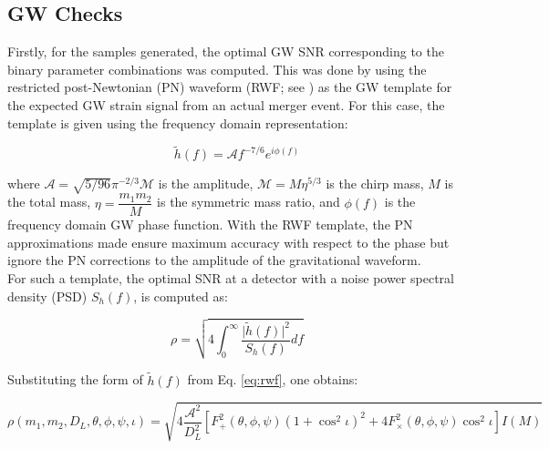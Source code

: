     \subsection{GW Checks}\label{sub:gw_checks}

        Firstly, for the samples generated, the optimal GW SNR corresponding to the
        binary parameter combinations was computed. This was done by using the
        restricted post-Newtonian (PN) waveform (RWF; see \cite{cutler_1994}) as the GW
        template for the expected GW strain signal from an actual merger event. For this
        case, the template is given using the frequency domain representation:

        \begin{equation}
            \tilde{h}(f) = \mathcal{A}f^{-7/6}e^{i\phi(f)}
            \label{eq:rwf}
        \end{equation}

        where $\mathcal{A} = \sqrt{5/96}\pi^{-2/3} \mathcal{M}$ is the amplitude,
        $\mathcal{M} = M \eta^{5/3}$ is the chirp mass, $M$ is the total mass, $\eta =
        \dfrac{m_1 m_2}{M}$ is the symmetric mass ratio, and $\phi(f)$ is the frequency
        domain GW phase function. With the RWF template, the PN approximations made
        ensure maximum accuracy with respect to the phase but ignore the PN corrections
        to the amplitude of the gravitational waveform.\\
        For such a template, the optimal SNR at a  detector with a noise power spectral
        density (PSD) $S_h(f)$, is computed as:

        \begin{equation}
            \rho = \sqrt{
                            4\int_0^\infty
                            \dfrac{\lvert \tilde{h}(f) \rvert^2}{S_h(f)}
                            df
                        }
            \label{eq:rho}
        \end{equation}

        Substituting the form of $\tilde{h}(f)$ from Eq. \ref{eq:rwf}, one obtains:

        \begin{equation}
            \rho(m_1, m_2, D_L, \theta, \phi, \psi, \iota) = \sqrt{
                4 \dfrac{\mathcal{A}^2}{D_L^2}
                \left[
                    F_{+}^2(\theta, \phi, \psi)(1 + \cos^2 \iota)^2 +
                    4 F_{\times}^2(\theta, \phi, \psi) \cos^2 \iota
                \right]
                 I(M)
                }
        \end{equation}

